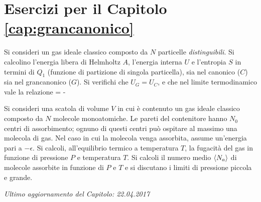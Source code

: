\section{Esercizi per il Capitolo \ref{cap:grancanonico}}

\begin{Exercise}[title={Equivalenza tra \ensembles},label={ex:05-eqcgc}]
\noindent
Si consideri un gas ideale classico composto da $N$ particelle {\em distinguibili}. Si calcolino l'energia libera di Helmholtz $A$, l'energia interna $U$ e l'entropia $S$ in termini di $Q_1$ (funzione di partizione di singola particella), sia nel canonico ($C$) sia nel grancanonico ($G$). Si verifichi che $U_G = U_C$, e che nel limite termodinamico vale la relazione
\be
{} = - \simeq {}
\ee
\end{Exercise}


\begin{Exercise}[title={Scatola a sorpresa},label={ex:05-sas}]
\noindent
Si consideri una scatola di volume $V$ in cui è contenuto un gas ideale classico composto da $N$ molecole monoatomiche. Le pareti del contenitore hanno $N_0$ centri di assorbimento; ognuno di questi centri può ospitare al massimo una molecola di gas. Nel caso in cui la molecola venga assorbita, assume un'energia pari a $-\epsilon$. Si calcoli, all'equilibrio termico a temperatura $T$, la fugacità del gas in funzione di pressione $P$ e temperatura $T$. Si calcoli il numero medio $\langle N_a\rangle$ di molecole assorbite in funzione di $P$ e $T$ e si discutano i limiti di pressione piccola e grande.
\end{Exercise}


\vskip 0.75cm
\begin{flushright}
{\em Ultimo aggiornamento del Capitolo: 22.04.2017}
\end{flushright}
